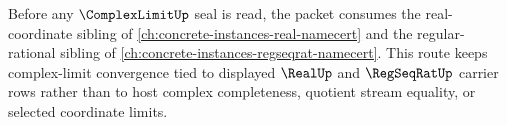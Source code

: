 Before any $\ComplexLimitUp$ seal is read, the packet consumes the real-coordinate sibling of \autoref{ch:concrete-instances-real-namecert} and the regular-rational sibling of \autoref{ch:concrete-instances-regseqrat-namecert}. This route keeps complex-limit convergence tied to displayed $\RealUp$ and $\RegSeqRatUp$ carrier rows rather than to host complex completeness, quotient stream equality, or selected coordinate limits.
